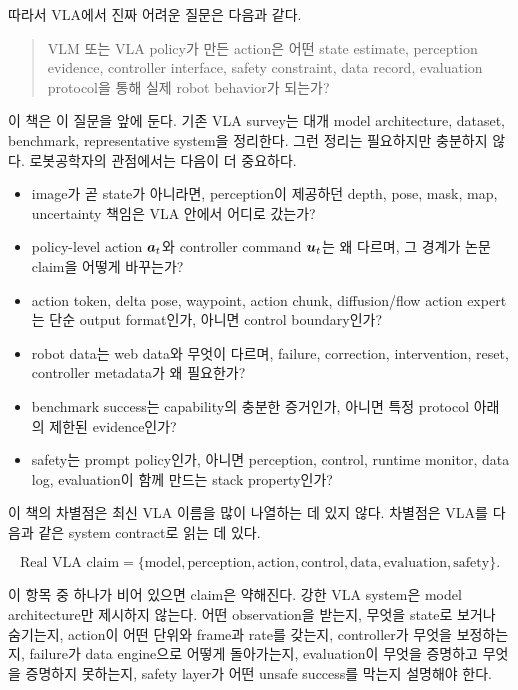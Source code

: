 따라서 VLA에서 진짜 어려운 질문은 다음과 같다.

\begin{quote}
VLM 또는 VLA policy가 만든 action은 어떤 state estimate, perception evidence, controller interface, safety constraint, data record, evaluation protocol을 통해 실제 robot behavior가 되는가?
\end{quote}

이 책은 이 질문을 앞에 둔다. 기존 VLA survey는 대개 model architecture, dataset, benchmark, representative system을 정리한다. 그런 정리는 필요하지만 충분하지 않다. 로봇공학자의 관점에서는 다음이 더 중요하다.

\begin{itemize}
  \item image가 곧 state가 아니라면, perception이 제공하던 depth, pose, mask, map, uncertainty 책임은 VLA 안에서 어디로 갔는가?
  \item policy-level action $\bm{a}_t$와 controller command $\bm{u}_t$는 왜 다르며, 그 경계가 논문 claim을 어떻게 바꾸는가?
  \item action token, delta pose, waypoint, action chunk, diffusion/flow action expert는 단순 output format인가, 아니면 control boundary인가?
  \item robot data는 web data와 무엇이 다르며, failure, correction, intervention, reset, controller metadata가 왜 필요한가?
  \item benchmark success는 capability의 충분한 증거인가, 아니면 특정 protocol 아래의 제한된 evidence인가?
  \item safety는 prompt policy인가, 아니면 perception, control, runtime monitor, data log, evaluation이 함께 만드는 stack property인가?
\end{itemize}

이 책의 차별점은 최신 VLA 이름을 많이 나열하는 데 있지 않다. 차별점은 VLA를 다음과 같은 system contract로 읽는 데 있다.

\begin{equation*}
  \text{Real VLA claim}
  =
  \{\text{model},\text{perception},\text{action},\text{control},\text{data},\text{evaluation},\text{safety}\}.
\end{equation*}

이 항목 중 하나가 비어 있으면 claim은 약해진다. 강한 VLA system은 model architecture만 제시하지 않는다. 어떤 observation을 받는지, 무엇을 state로 보거나 숨기는지, action이 어떤 단위와 frame과 rate를 갖는지, controller가 무엇을 보정하는지, failure가 data engine으로 어떻게 돌아가는지, evaluation이 무엇을 증명하고 무엇을 증명하지 못하는지, safety layer가 어떤 unsafe success를 막는지 설명해야 한다.

